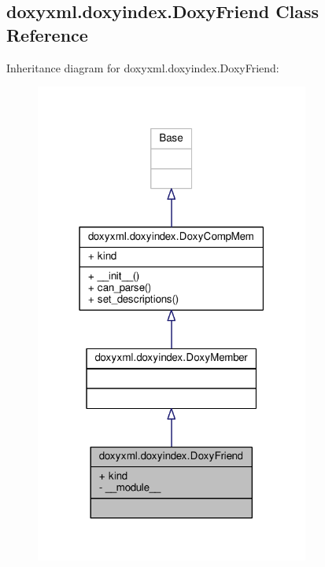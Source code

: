 \subsection{doxyxml.\+doxyindex.\+Doxy\+Friend Class Reference}
\label{classdoxyxml_1_1doxyindex_1_1DoxyFriend}


Inheritance diagram for doxyxml.\+doxyindex.\+Doxy\+Friend\+:
\nopagebreak
\begin{figure}[H]
\begin{center}
\leavevmode
\includegraphics[width=255pt]{d2/d68/classdoxyxml_1_1doxyindex_1_1DoxyFriend__inherit__graph}
\end{center}
\end{figure}


